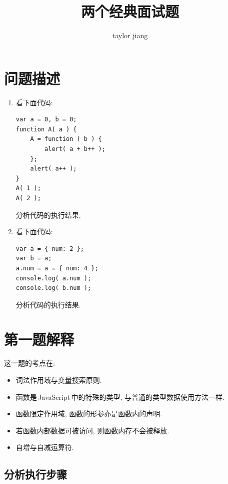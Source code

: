 \documentclass[UTF8, noindent]{ctexart}
\title{两个经典面试题}
\author{taylor jiang}
\begin{document}
\maketitle

\tableofcontents

\section{问题描述}
{
\renewcommand{\labelenumi}{\bfseries\sffamily 问题\,\arabic{enumi}:}

\begin{enumerate}

\item 看下面代码:

\begin{lstlisting}
var a = 0, b = 0;
function A( a ) {
    A = function ( b ) {
        alert( a + b++ );
    };
    alert( a++ );
}
A( 1 );
A( 2 );
\end{lstlisting}

分析代码的执行结果.


\item 看下面代码:

\begin{lstlisting}
var a = { num: 2 };
var b = a;
a.num = a = { num: 4 };
console.log( a.num );
console.log( b.num );
\end{lstlisting}

分析代码的执行结果.


\end{enumerate}
}


\section{第一题解释}

这一题的考点在:

\begin{itemize}
\item 词法作用域与变量搜索原则.
\item 函数是\,JavaScript\,中的特殊的类型, 与普通的类型数据使用方法一样.
\item 函数限定作用域, 函数的形参亦是函数内的声明.
\item 若函数内部数据可被访问, 则函数内存不会被释放.
\item 自增与自减运算符.
\end{itemize}


\subsection{分析执行步骤}
\end{document}
